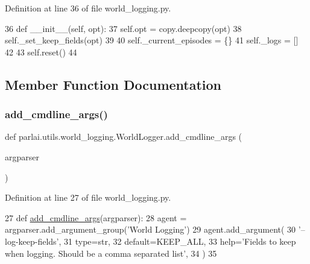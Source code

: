 Definition at line 36 of file world\+\_\+logging.\+py.


\begin{DoxyCode}
36     \textcolor{keyword}{def }\_\_init\_\_(self, opt):
37         self.opt = copy.deepcopy(opt)
38         self.\_set\_keep\_fields(opt)
39 
40         self.\_current\_episodes = \{\}
41         self.\_logs = []
42 
43         self.reset()
44 
\end{DoxyCode}


\subsection{Member Function Documentation}
\mbox{\label{classparlai_1_1utils_1_1world__logging_1_1WorldLogger_a5e5cf4e2cabbf48f39e5e09b7578283a}} 
\subsubsection{\texorpdfstring{add\+\_\+cmdline\+\_\+args()}{add\_cmdline\_args()}}
{\footnotesize\ttfamily def parlai.\+utils.\+world\+\_\+logging.\+World\+Logger.\+add\+\_\+cmdline\+\_\+args (\begin{DoxyParamCaption}\item[{}]{argparser }\end{DoxyParamCaption})\hspace{0.3cm}{\ttfamily [static]}}



Definition at line 27 of file world\+\_\+logging.\+py.


\begin{DoxyCode}
27     \textcolor{keyword}{def }\hyperlink{namespaceparlai_1_1agents_1_1drqa_1_1config_a62fdd5554f1da6be0cba185271058320}{add\_cmdline\_args}(argparser):
28         agent = argparser.add\_argument\_group(\textcolor{stringliteral}{'World Logging'})
29         agent.add\_argument(
30             \textcolor{stringliteral}{'--log-keep-fields'},
31             type=str,
32             default=KEEP\_ALL,
33             help=\textcolor{stringliteral}{'Fields to keep when logging. Should be a comma separated list'},
34         )
35 
\end{DoxyCode}
\mbox{\label{classparlai_1_1utils_1_1world__logging_1_1WorldLogger_aef9b66c44083ace9c8c35a0b41828c34}} 
